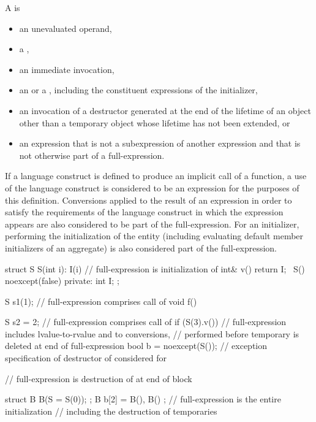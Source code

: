\pnum
A  is
\begin{itemize}
\item
an unevaluated operand,
\item
a ,
\item
an immediate invocation,
\item
an  or
a ,
including the constituent expressions of the initializer,
\item
an invocation of a destructor generated at the end of the lifetime
of an object other than a temporary object
whose lifetime has not been extended, or
\item
an expression that is not a subexpression of another expression and
that is not otherwise part of a full-expression.
\end{itemize}
If a language construct is defined to produce an implicit call of a function,
a use of the language construct is considered to be an expression
for the purposes of this definition.
Conversions applied to the result of an expression in order to satisfy the requirements
of the language construct in which the expression appears
are also considered to be part of the full-expression.
For an initializer, performing the initialization of the entity
(including evaluating default member initializers of an aggregate)
is also considered part of the full-expression.
\begin{example}
\begin{codeblock}
struct S {
  S(int i): I(i) { }            // full-expression is initialization of 
  int& v() { return I; }
  ~S() noexcept(false) { }
private:
  int I;
};

S s1(1);                        // full-expression comprises call of 
void f() {
  S s2 = 2;                     // full-expression comprises call of 
  if (S(3).v())                 // full-expression includes lvalue-to-rvalue and  to  conversions,
                                // performed before temporary is deleted at end of full-expression
  { }
  bool b = noexcept(S());       // exception specification of destructor of  considered for 

  // full-expression is destruction of  at end of block
}
struct B {
  B(S = S(0));
};
B b[2] = { B(), B() };          // full-expression is the entire initialization
                                // including the destruction of temporaries
\end{codeblock}
\end{example}

